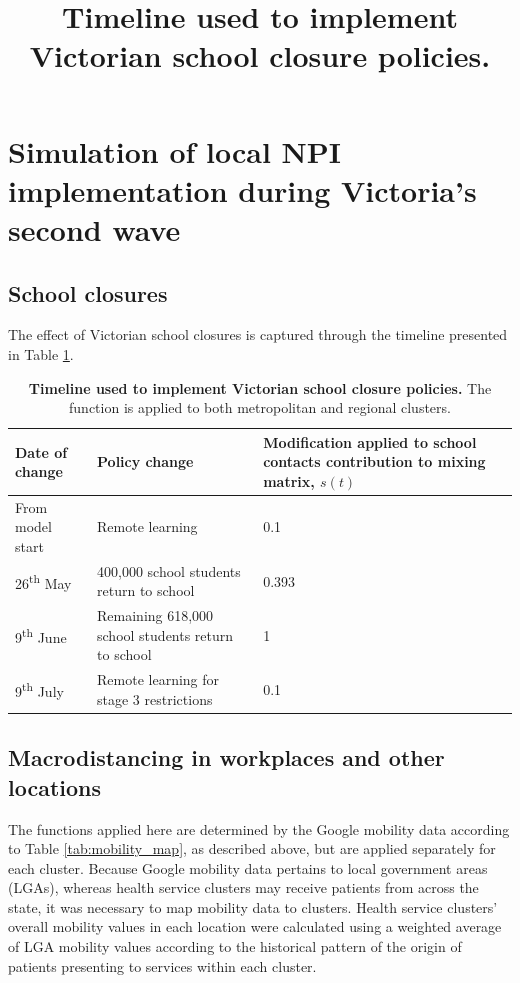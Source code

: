 \section{Simulation of local NPI implementation during Victoria's second wave}

\subsection{School closures}
The effect of Victorian school closures is captured through the timeline presented in Table \ref{tab:school_timeline}.


\begin{table}[ht]
\renewcommand{\baselinestretch}{1}
	\begin{tabular}[ht]{| p{4.2cm} | p{6.2cm} | p{3.2cm} |}
	\hline
		Date of change & Policy change & Modification applied to school contacts contribution to mixing matrix, \(s(t)\) \\
		\hline
		From model start & Remote learning & 0.1 \\
		\hline
		26\textsuperscript{th} May & 400,000 school students return to school & 0.393 \\
		\hline
		9\textsuperscript{th} June & Remaining 618,000 school students return to school & 1 \\
		\hline
		9\textsuperscript{th} July & Remote learning for stage 3 restrictions & 0.1 \\
		\hline
    \end{tabular}
    \title{Timeline used to implement Victorian school closure policies.}
    \caption{\textbf{Timeline used to implement Victorian school closure policies.} The function is applied to both metropolitan and regional clusters.}	
    \label{tab:school_timeline}
\end{table}

\subsection{Macrodistancing in workplaces and other locations}
The functions applied here are determined by the Google mobility data according to Table \ref{tab:mobility_map}, as described above, but are applied separately for each cluster. Because Google mobility data pertains to local government areas (LGAs), whereas health service clusters may receive patients from across the state, it was necessary to map mobility data to clusters. Health service clusters' overall mobility values in each location were calculated using a weighted average of LGA mobility values according to the historical pattern of the origin of patients presenting to services within each cluster.

